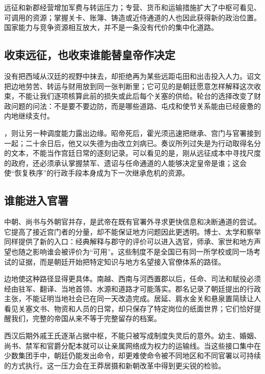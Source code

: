 \begin{causalchain}[财政集中带来的新瓶颈]
远征和新郡经营增加军费与转运压力；专营、货币和运输措施扩大了中枢可看见、可调用的资源；掌握关卡、账簿、铸造或近侍通道的人也因此获得新的政治位置。国家能力与竞争资源相互放大，并不是一条没有代价的集中化道路。
\end{causalchain}

\subsection{收束远征，也收束谁能替皇帝作决定}

没有把西域从汉廷的视野中抹去，却拒绝再为某些远距屯田和出击投入人力。诏文把边地劳苦、转运与财用放到同一张判断里；它可见的是朝廷愿意怎样解释这次收束，不能让我们逐项核算此前的损失或此后每个关塞的供给。轮台的选择改变了财政问题的问法：不是要不要边防，而是哪些道路、屯戍和使节关系能由已经疲惫的内地继续支付。

，则让另一种调度能力露出边缘。昭帝死后，霍光须迅速把继承、宫门与官署接到一起；二十余日后，他又以失德为由改立刘病已。奏议所列过失是为行动取得名分的文本，不能当作宫廷日常的逐刻记录。可以看见的是，刚从远征成本中寻找尺度的政府，还必须承认掌握禁军、遗诏与任命通道的人能够决定皇帝是谁；这会使“恢复秩序”的行政手段本身成为下一次继承危机的资源。

\subsection{谁能进入官署}

中朝、尚书与外朝官并存，是武帝在既有官署外寻求更快信息和决断通道的尝试。它提高了接近宫门者的分量，却不能保证地方问题因此更透明。博士、太学和察举同样提供了新的入口：经典解释与郡守的评价可以进入选官，师承、家世和地方声望也随之影响谁会被评价为“可用”。这些制度不是全国已有同一所学校或同一场考试的证据，而是朝廷开始把特定知识与地方名望接入官僚体系的路径。

边地使这种路径显得更具体。南越、西南与河西置郡以后，任命、司法和赋役必须经由驻军、翻译、当地首领、水源和道路才可能落实。郡名记录了朝廷提出的行政主张，不能证明当地社会已在同一天改造完成。居延、肩水金关和悬泉置简牍让人看见关塞文书、物资和人员的日常，却只保存了特定岗位的纸面世界；它们恰好提醒我们，完整的帝国从来不等于完整留存的档案。

西汉后期外戚王氏逐渐占据中枢，不能只被写成制度失灵后的意外。幼主、婚姻、尚书、禁军和官爵分配本就可以让亲属网络成为权力的运输线。当这些接口集中在少数集团手中，朝廷仍能发出命令，却更难使命令被不同地区和不同官署以可持续的方式执行。这一压力会在王莽居摄和新朝改革中得到更尖锐的检验。


